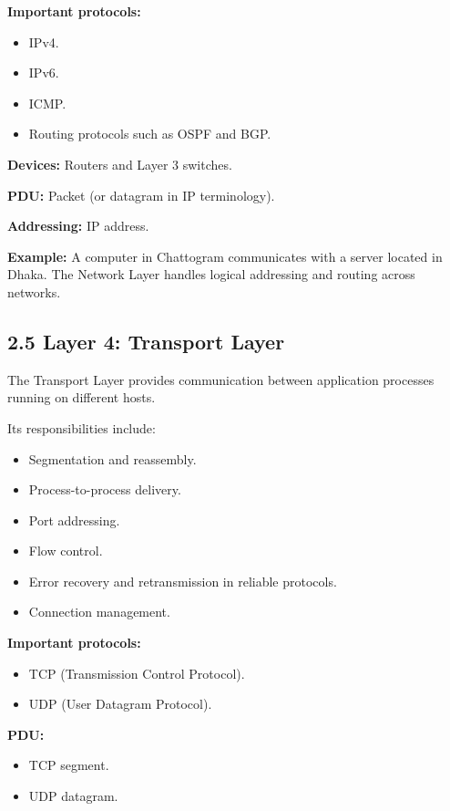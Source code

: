 \textbf{Important protocols:}

\begin{itemize}
    \item IPv4.
    \item IPv6.
    \item ICMP.
    \item Routing protocols such as OSPF and BGP.
\end{itemize}

\textbf{Devices:} Routers and Layer 3 switches.

\textbf{PDU:} Packet (or datagram in IP terminology).

\textbf{Addressing:} IP address.

\textbf{Example:} A computer in Chattogram communicates with a server located in Dhaka. The Network Layer handles logical addressing and routing across networks.

\subsection{2.5 Layer 4: Transport Layer}

The Transport Layer provides communication between application processes running on different hosts.

Its responsibilities include:

\begin{itemize}
    \item Segmentation and reassembly.
    \item Process-to-process delivery.
    \item Port addressing.
    \item Flow control.
    \item Error recovery and retransmission in reliable protocols.
    \item Connection management.
\end{itemize}

\textbf{Important protocols:}

\begin{itemize}
    \item TCP (Transmission Control Protocol).
    \item UDP (User Datagram Protocol).
\end{itemize}

\textbf{PDU:}

\begin{itemize}
    \item TCP segment.
    \item UDP datagram.
\end{itemize}


